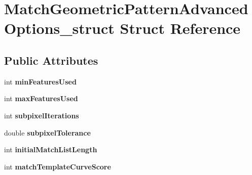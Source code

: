 \hypertarget{structMatchGeometricPatternAdvancedOptions__struct}{
\section{MatchGeometricPatternAdvancedOptions\_\-struct Struct Reference}
\label{structMatchGeometricPatternAdvancedOptions__struct}
}
\subsection*{Public Attributes}
\begin{DoxyCompactItemize}
\item 
\hypertarget{structMatchGeometricPatternAdvancedOptions__struct_a3404ce486e3357e219453ff8784a9b34}{
int {\bfseries minFeaturesUsed}}
\label{structMatchGeometricPatternAdvancedOptions__struct_a3404ce486e3357e219453ff8784a9b34}

\item 
\hypertarget{structMatchGeometricPatternAdvancedOptions__struct_a2ca01bbcdb8d968124a626c183afb075}{
int {\bfseries maxFeaturesUsed}}
\label{structMatchGeometricPatternAdvancedOptions__struct_a2ca01bbcdb8d968124a626c183afb075}

\item 
\hypertarget{structMatchGeometricPatternAdvancedOptions__struct_a7f5d0e133a2de4433536309887ca57df}{
int {\bfseries subpixelIterations}}
\label{structMatchGeometricPatternAdvancedOptions__struct_a7f5d0e133a2de4433536309887ca57df}

\item 
\hypertarget{structMatchGeometricPatternAdvancedOptions__struct_ab2ec5c7a9d58f98b03a155200e91e011}{
double {\bfseries subpixelTolerance}}
\label{structMatchGeometricPatternAdvancedOptions__struct_ab2ec5c7a9d58f98b03a155200e91e011}

\item 
\hypertarget{structMatchGeometricPatternAdvancedOptions__struct_a830ca43adb6865a7fa5a000e275a2006}{
int {\bfseries initialMatchListLength}}
\label{structMatchGeometricPatternAdvancedOptions__struct_a830ca43adb6865a7fa5a000e275a2006}

\item 
\hypertarget{structMatchGeometricPatternAdvancedOptions__struct_ae570d5a18234d831a44fc0d02c4e7819}{
int {\bfseries matchTemplateCurveScore}}
\label{structMatchGeometricPatternAdvancedOptions__struct_ae570d5a18234d831a44fc0d02c4e7819}


\end{DoxyCompactItemize}
